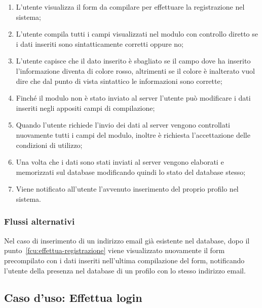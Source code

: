 		\begin{enumerate}
			
			\item
			L'utente visualizza il form da compilare per effettuare la registrazione nel sistema;
			
			\item
			L'utente compila tutti i campi visualizzati nel modulo con controllo diretto se i dati inseriti sono sintatticamente corretti oppure no;
			
			\item
			L'utente capisce che il dato inserito è sbagliato se il campo dove ha inserito l'informazione diventa di colore rosso, altrimenti se il colore è inalterato vuol dire che dal punto di vista sintattico le informazioni sono corrette;
			
			\item
			Finché il modulo non è stato inviato al server l'utente può modificare i dati inseriti negli appositi campi di compilazione;
			
			\item
			\label{fcu:effettua-registrazione}
			Quando l'utente richiede l'invio dei dati al server vengono controllati nuovamente tutti i campi del modulo, inoltre è richiesta l'accettazione delle condizioni di utilizzo;
			
			\item
			Una volta che i dati sono stati inviati al server vengono elaborati e memorizzati sul database modificando quindi lo stato del database stesso;
			
			\item
			Viene notificato all'utente l'avvenuto inserimento del proprio profilo nel sistema.
			
		\end{enumerate}
	
	\subsubsection*{Flussi alternativi}
	Nel caso di inserimento di un indirizzo email già esistente nel database, dopo il punto~\ref{fcu:effettua-registrazione} viene visualizzato nuovamente il form precompilato con i dati inseriti nell'ultima compilazione del form, notificando l'utente della presenza nel database di un profilo con lo stesso indirizzo email.

%
%
\subsection{Caso d'uso: Effettua login}

